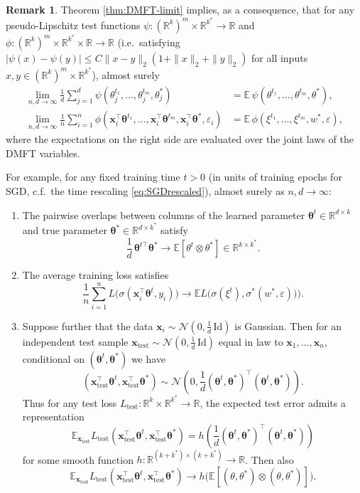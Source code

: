 \documentclass[11pt,letterpaper,reqno]{amsart}
\theoremstyle{definition}
\newtheorem{remark}[thm]{Remark}
\def\eps{\varepsilon}
\def\E{\mathbb{E}}
\def\R{\mathbb{R}}
\def\Id{\mathrm{Id}}
\def\cN{\mathcal{N}}
\def\x{\mathbf{x}}
\def\btheta{\boldsymbol{\theta}}
\begin{document}
\begin{remark}
Theorem \ref{thm:DMFT-limit} implies, as a consequence, that for any
pseudo-Lipschitz test functions
$\psi:(\R^k)^m \times \R^{k^*} \to \R$ 
and $\phi:(\R^k)^m \times \R^{k^*} \times \R \to \R$
(i.e.\ satisfying
$|\psi(x)-\psi(y)| \leq C\|x-y\|_2(1+\|x\|_2+\|y\|_2)$ for all inputs $x,y \in (\R^k)^m \times \R^{k^*}$), almost surely
\begin{align*}
\lim_{n,d \to \infty} \frac{1}{d}\sum_{j=1}^d
\psi(\theta_j^{t_1},\ldots,\theta_j^{t_m},\theta_j^*)
&=\E\,\psi(\theta^{t_1},\ldots,\theta^{t_m},\theta^*),\\
\lim_{n,d \to \infty} \frac{1}{n}\sum_{i=1}^n
\phi(\x_i^\top \btheta^{t_1},\ldots,\x_i^\top \btheta^{t_m},\x_i^\top
\btheta^*,\eps_i)
&=\E\,\phi(\xi^{t_1},\ldots,\xi^{t_m},w^*,\eps),
\end{align*}
where the expectations on the right side are evaluated over the joint laws of
the DMFT variables.

For example, for any fixed training time $t>0$ (in units of training epochs for
SGD, c.f.\ the time rescaling \eqref{eq:SGDrescaled}), almost surely as $n,d \to \infty$:
\begin{enumerate}
\item The pairwise overlaps between columns of the learned parameter
$\btheta^t \in \R^{d \times k}$ and true parameter
$\btheta^* \in \R^{d \times k^*}$ satisfy
\[\frac{1}{d}\,\btheta^{t\top}\btheta^*
\to \E[\theta^t \otimes \theta^*] \in \R^{k \times k^*}.\]
\item The average training loss satisfies
\[\frac{1}{n}\sum_{i=1}^n L\big(\sigma(\x_i^\top \btheta^t,y_i)\big)
\to \E L\big(\sigma(\xi^t),\sigma^*(w^*,\eps))\big).\]
\item Suppose further that the data $\x_i \sim \cN(0,\frac{1}{d}\,\Id)$ is Gaussian. Then for an
independent test
sample $\x_\mathrm{test} \sim \cN(0,\frac{1}{d}\,\Id)$ equal in law to $\x_1,\ldots,\x_n$, conditional on $(\btheta^t,\btheta^*)$ we have
\[(\x_\text{test}^\top\btheta^t,\x_\text{test}^\top\btheta^*)
\sim \cN\left(0,\frac{1}{d}(\btheta^t,\btheta^*)^\top(\btheta^t,\btheta^*)\right).\]
Thus for any test loss $L_\text{test}:\R^k \times \R^{k^*} \to \R$, the expected
test error admits a representation
\[\E_{\x_\mathrm{test}} L_\text{test}(\x_{\text{test}}^\top \btheta^t,\x_{\text{test}}^\top \btheta^*)
=h\left(\frac{1}{d}(\btheta^t,\btheta^*)^\top(\btheta^t,\btheta^*)\right)\]
for some smooth function $h:\R^{(k+k^*) \times (k+k^*)} \to \R$. Then also
\[\E_{\x_\mathrm{test}} L_\text{test}(\x_{\text{test}}^\top \btheta^t,\x_{\text{test}}^\top \btheta^*)
\to h\big(\E[(\theta,\theta^*) \otimes (\theta,\theta^*)]\big).\]
\end{enumerate}
\end{remark}
\end{document}
